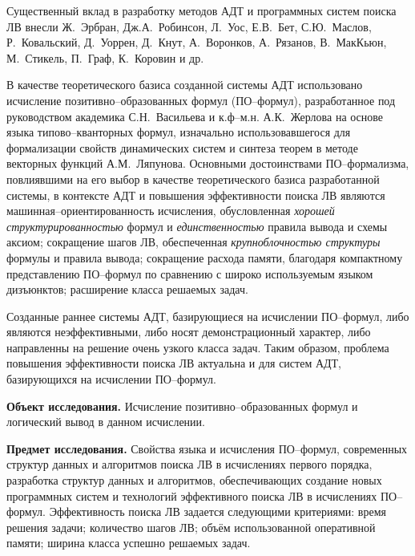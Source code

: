 \documentclass[a4paper]{report}
\begin{document}
Существенный вклад в разработку методов АДТ и программных систем поиска ЛВ внесли Ж.~Эрбран, Дж.А.~Робинсон, Л.~Уос, Е.В.~Бет, С.Ю.~Маслов, Р.~Ковальский, Д.~Уоррен, Д.~Кнут, А.~Воронков, А.~Рязанов, В.~МакКьюн, М.~Сти\-кель, П.~Граф, К.~Коровин и др. %

В качестве теоретического базиса созданной системы АДТ использовано исчисление позитивно--образованных формул (ПО--формул), разработанное под руководством академика С.Н.~Васильева и к.ф--м.н. А.К.~Жерлова на основе языка типово--кванторных формул, изначально использовавшегося для формализации свойств динамических систем и синтеза теорем в методе векторных функций А.М.~Ляпунова. Основными достоинствами ПО--формализма, повлиявшими на его выбор в качестве теоретического базиса разработанной системы, в контексте АДТ и повышения эффективности поиска ЛВ являются машинная--ориентированность исчисления, обусловленная \emph{хорошей структурированностью} формул и \emph{единственностью} правила вывода и схемы аксиом; сокращение шагов ЛВ, обеспеченная \emph{крупноблочностью структуры} формулы и правила вывода; сокращение расхода памяти, благодаря компактному представлению ПО--формул по сравнению с широко используемым языком дизъюнктов; расширение класса решаемых задач. %

Созданные раннее системы АДТ, базирующиеся на исчислении ПО--формул, либо являются неэффективными, либо носят демонстрационный характер, либо направленны на решение очень узкого класса задач. Таким образом, проблема повышения эффективности поиска ЛВ актуальна и для систем АДТ, базирующихся на исчислении ПО--формул.

\textbf{Объект исследования.}
Исчисление позитивно--образованных формул и логический вывод в данном исчислении.

\textbf{Предмет исследования.}
Свойства языка и исчисления ПО--формул, современных структур данных и алгоритмов поиска ЛВ в исчислениях первого порядка, разработка структур данных и алгоритмов, обеспечивающих создание новых программных систем и технологий эффективного поиска ЛВ в исчислениях ПО--формул. Эффективность поиска ЛВ задается следующими критериями: время решения задачи; количество шагов ЛВ; объём использованной оперативной памяти; ширина класса успешно решаемых задач.
\end{document}
